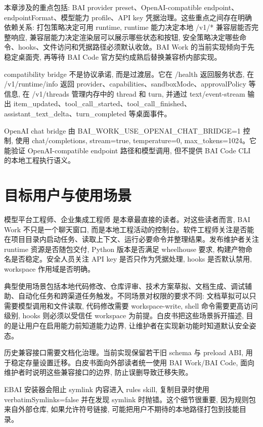 本章涉及的重点包括: BAI provider preset、OpenAI-compatible endpoint、endpointFormat、模型能力 profile、API key 凭据治理。这些重点之间存在明确依赖关系: 打包策略决定可用 runtime, runtime 能力决定本地 /v1/* 兼容层能否完整响应, 兼容层能力决定渲染层可以展示哪些状态和按钮, 安全策略决定哪些命令、hooks、文件访问和凭据路径必须默认收敛。BAI Work 的当前实现倾向于先稳定桌面壳, 再等待 BAI Code 官方契约成熟后替换兼容桥内部实现。

compatibility bridge 不是协议承诺, 而是过渡层。它在 /health 返回服务状态, 在 /v1/runtime/info 返回 provider、capabilities、sandboxMode、approvalPolicy 等信息, 在 /v1/threads 管理内存中的 thread 和 turn, 并通过 text/event-stream 输出 item\_updated、tool\_call\_started、tool\_call\_finished、assistant\_text\_delta、turn\_completed 等桌面事件。

OpenAI chat bridge 由 BAI\_WORK\_USE\_OPENAI\_CHAT\_BRIDGE=1 控制, 使用 chat/completions, stream=true, temperature=0, max\_tokens=1024。它能验证 OpenAI-compatible endpoint 路径和模型调用, 但不提供 BAI Code CLI 的本地工程执行语义。

\section{目标用户与使用场景}
模型平台工程师、企业集成工程师 是本章最直接的读者。对这些读者而言, BAI Work 不只是一个聊天窗口, 而是本地工程活动的控制台。软件工程师关注是否能在项目目录内启动任务、读取上下文、运行必要命令并整理结果。发布维护者关注 runtime 资源是否随包交付, Python 版本是否满足 wheelhouse 要求, 构建产物命名是否稳定。安全人员关注 API key 是否只作为凭据处理, hooks 是否默认禁用, workspace 作用域是否明确。

典型使用场景包括本地代码修改、仓库评审、技术方案草拟、文档生成、调试辅助、自动化任务和跨渠道任务触发。不同场景对权限的要求不同: 文档草拟可以只需要模型调用和文件读取, 代码修改需要 workspace-write, shell 命令需要更高访问级别, hooks 则必须以受信任 workspace 为前提。白皮书把这些场景拆开描述, 目的是让用户在启用能力前知道能力边界, 让维护者在实现新功能时知道默认安全姿态。

历史兼容接口需要文档化治理。当前实现保留若干旧 schema 与 preload ABI, 用于稳定存量设置迁移。白皮书面向外部读者统一使用 BAI Work/BAI Code, 面向维护者时说明这些兼容接口的边界, 防止误删导致迁移失败。

EBAI 安装器会阻止 symlink 内容进入 rules skill, 复制目录时使用 verbatimSymlinks=false 并在发现 symlink 时抛错。这个细节很重要, 因为规则包来自外部仓库, 如果允许符号链接, 可能把用户不期待的本地路径打包到技能目录。

